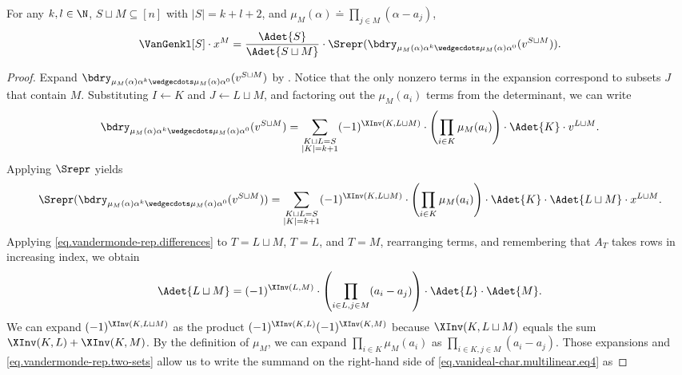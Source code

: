 \begin{lemma}
  \label{lem.simplicial-vangen-high-degree}
  For any \(k,l \in \N\), \(S\sqcup M \subseteq [n]\) with $|S|=k+l+2$, and $\mu_M(\alpha) \doteq \prod_{j \in M}(\alpha - a_j)$, 
  \begin{equation} \label{eq.simplicial-vangen-high-degree}
    \VanGenkl[S]\cdot x^M = 
    \frac{\Adet{S}}{\Adet{S \sqcup M}} \cdot \Srepr(\bdry_{\mu_M(\alpha)\alpha^k\wedgecdots \mu_M(\alpha)\alpha^0}(v^{S \sqcup M})).
  \end{equation}
\end{lemma}

\begin{proof}
Expand $\bdry_{\mu_M(\alpha)\alpha^k\wedgecdots \mu_M(\alpha)\alpha^0} (v^{S \sqcup M})$ by . Notice that the only nonzero terms in the expansion correspond to subsets $J$ that contain $M$. Substituting $I \gets K$ and $J \gets L \sqcup M$, and factoring out the $\mu_M(a_i)$ terms from the determinant, we can write
%
\[ \bdry_{\mu_M(\alpha)\alpha^k\wedgecdots \mu_M(\alpha)\alpha^0}(v^{S \sqcup M}) = 
\sum_{\substack{K\sqcup L=S\\ |K|=k+1}} (-1)^{\XInv(K,L\sqcup M)} \cdot \left(\prod_{i\in K} \mu_M(a_{i})\right) \cdot \Adet{K} \cdot v^{L \sqcup M}. 
\]
Applying $\Srepr$ yields
\begin{equation}\label{eq.vanideal-char.multilinear.eq4}
\Srepr(\bdry_{\mu_M(\alpha)\alpha^k\wedgecdots \mu_M(\alpha)\alpha^0}(v^{S \sqcup M})) = 
\sum_{\substack{K\sqcup L=S\\ |K|=k+1}} (-1)^{\XInv(K,L\sqcup M)} \cdot \left(\prod_{i\in K} \mu_M(a_{i})\right) 
    \cdot \Adet{K} \cdot \Adet{L \sqcup M} \cdot x^{L \sqcup M}. 
\end{equation}
Applying \eqref{eq.vandermonde-rep.differences} to $T=L \sqcup M$, $T=L$, and $T=M$, rearranging terms, and remembering that $A_T$ takes rows in increasing index, we obtain
\begin{equation}
\label{eq.vandermonde-rep.two-sets}
\Adet{L \sqcup M} = (-1)^{\XInv(L,M)}\cdot \left( \prod_{i\in L,j\in M} (a_{i}-a_{j})\right) \cdot \Adet{L} \cdot \Adet{M}.
\end{equation}
We can expand $(-1)^{\XInv(K,L\sqcup M)}$ as the product $(-1)^{\XInv(K,L)} (-1)^{\XInv(K,M)}$ because
$\XInv(K,L \sqcup M)$ equals the sum $\XInv(K,L)+\XInv(K,M)$.
By the definition of $\mu_M$, we can expand $\prod_{i \in K} \mu_M(a_i)$ as $\prod_{i\in K, j \in M} (a_i-a_j)$. Those expansions and \eqref{eq.vandermonde-rep.two-sets} allow us to write the summand on the right-hand side of \eqref{eq.vanideal-char.multilinear.eq4} as

\end{proof}

